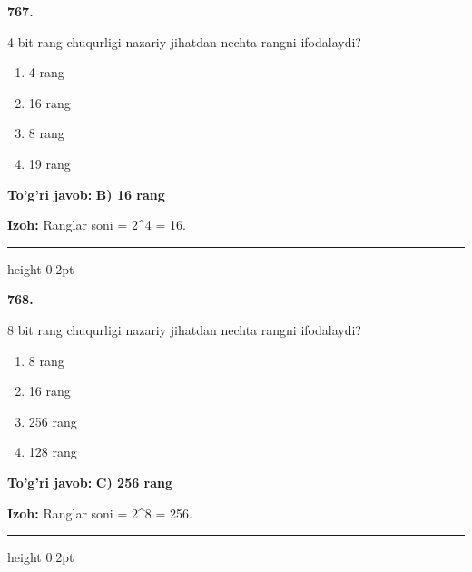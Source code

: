 \documentclass[10pt,a4paper,oneside]{article}
\begin{document}
\noindent\textbf{\color{ink}767.}
\par
4 bit rang chuqurligi nazariy jihatdan nechta rangni ifodalaydi?
\begin{enumerate}[label=\Alph*),leftmargin=9mm]
\item 4 rang
\item 16 rang
\item 8 rang
\item 19 rang
\end{enumerate}
\begin{tcolorbox}[enhanced,breakable,colback=teal!4,colframe=teal!50!black,boxrule=0.5pt,arc=1.1mm,left=3mm,right=3mm,top=1.7mm,bottom=1.7mm,before skip=2mm,after skip=2mm]
\textbf{\color{teal}To'g'ri javob:} \textbf{B) 16 rang}
\par\smallskip
\textbf{Izoh:} Ranglar soni = 2\textasciicircum{}4 = 16.
\end{tcolorbox}
\vspace{2mm}\hrule height 0.2pt \vspace{3mm}

\noindent\textbf{\color{ink}768.}
\par
8 bit rang chuqurligi nazariy jihatdan nechta rangni ifodalaydi?
\begin{enumerate}[label=\Alph*),leftmargin=9mm]
\item 8 rang
\item 16 rang
\item 256 rang
\item 128 rang
\end{enumerate}
\begin{tcolorbox}[enhanced,breakable,colback=teal!4,colframe=teal!50!black,boxrule=0.5pt,arc=1.1mm,left=3mm,right=3mm,top=1.7mm,bottom=1.7mm,before skip=2mm,after skip=2mm]
\textbf{\color{teal}To'g'ri javob:} \textbf{C) 256 rang}
\par\smallskip
\textbf{Izoh:} Ranglar soni = 2\textasciicircum{}8 = 256.
\end{tcolorbox}
\vspace{2mm}\hrule height 0.2pt \vspace{3mm}
\end{document}
